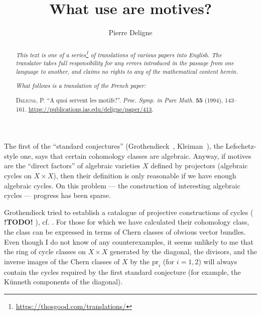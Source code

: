 \documentclass{article}
\title{What use are motives?}
\author{Pierre Deligne}
\date{}
\theoremstyle{definition}
\newcommand{\pr}{\mathrm{pr}}
\newcommand{\todo}{\textbf{ !TODO! }}
\newcommand{\oldpage}[1]{\marginpar{\footnotesize$\Big\vert$ \textit{p.~#1}}}
\begin{document}
\maketitle
\thispagestyle{fancy}

\renewcommand{\abstractname}{Translator's note.}

\begin{abstract}
  \renewcommand*{\thefootnote}{\fnsymbol{footnote}}
  \emph{This text is one of a series\footnote{\url{https://thosgood.com/translations/}} of translations of various papers into English.}
  \emph{The translator takes full responsibility for any errors introduced in the passage from one language to another, and claims no rights to any of the mathematical content herein.}
  
  \emph{What follows is a translation of the French paper:}

  \medskip\noindent
  \textsc{Deligne, P.}
  ``A quoi servent les motifs?''.
  \emph{Proc. Symp. in Pure Math.} \textbf{55} (1994), 143--161.
  {\footnotesize\url{https://publications.ias.edu/deligne/paper/413}}.
\end{abstract}

\setcounter{footnote}{0}

\setcounter{tocdepth}{1}
\tableofcontents
\bigskip



\oldpage{143}
The first of the ``standard conjectures'' (Grothendieck~\cite{19}, Kleiman~\cite{20}), the Lefschetz-style one, says that certain cohomology classes are algebraic.
Anyway, if motives are the ``direct factors'' of algebraic varieties $X$ defined by projectors (algebraic cycles on $X\times X$), then their definition is only reasonable if we have enough algebraic cycles.
On this problem --- the construction of interesting algebraic cycles --- progress has been sparse.

Grothendieck tried to establish a catalogue of projective constructions of cycles (\todo), cf. \cite[p.~197]{19}.
For those for which we have calculated their cohomology class, the class can be expressed in terms of Chern classes of obvious vector bundles.
Even though I do not know of any counterexamples, it seems unlikely to me that the ring of cycle classes on $X\times X$ generated by the diagonal, the divisors, and the inverse images of the Chern classes of $X$ by the $\pr_i$ (for $i=1,2$) will always contain the cycles required by the first standard conjecture (for example, the K\"{u}nneth components of the diagonal).
\end{document}
